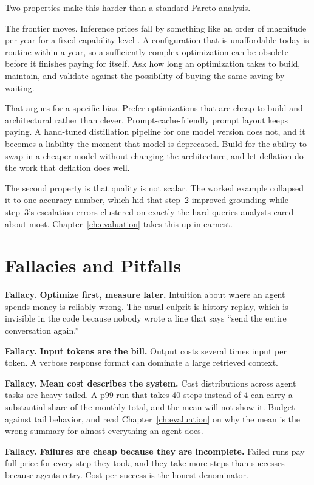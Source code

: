 Two properties make this harder than a standard Pareto analysis.

The frontier moves. Inference prices fall by something like an order of magnitude
per year for a fixed capability level \cite{llmflation2024, epochpricing2025}.
A configuration that is unaffordable today is routine within a year, so a
sufficiently complex optimization can be obsolete before it finishes paying for
itself. Ask how long an optimization takes to build, maintain, and validate
against the possibility of buying the same saving by waiting.

That argues for a specific bias. Prefer optimizations that are cheap to build and
architectural rather than clever. Prompt-cache-friendly prompt layout keeps
paying. A hand-tuned distillation pipeline for one model version does not, and it
becomes a liability the moment that model is deprecated. Build for the ability to
swap in a cheaper model without changing the architecture, and let deflation do
the work that deflation does well.

The second property is that quality is not scalar. The worked example collapsed
it to one accuracy number, which hid that step~2 improved grounding while
step~3's escalation errors clustered on exactly the hard queries analysts cared
about most. Chapter~\ref{ch:evaluation} takes this up in earnest.

\section{Fallacies and Pitfalls}

\textbf{Fallacy. Optimize first, measure later.} Intuition about where an agent
spends money is reliably wrong. The usual culprit is history replay, which is
invisible in the code because nobody wrote a line that says ``send the entire
conversation again.''

\textbf{Fallacy. Input tokens are the bill.} Output costs several times input per
token. A verbose response format can dominate a large retrieved context.

\textbf{Fallacy. Mean cost describes the system.} Cost distributions across agent
tasks are heavy-tailed. A p99 run that takes 40 steps instead of 4 can carry a
substantial share of the monthly total, and the mean will not show it. Budget
against tail behavior, and read Chapter~\ref{ch:evaluation} on why the mean is
the wrong summary for almost everything an agent does.

\textbf{Fallacy. Failures are cheap because they are incomplete.} Failed runs pay
full price for every step they took, and they take more steps than successes
because agents retry. Cost per success is the honest denominator.

